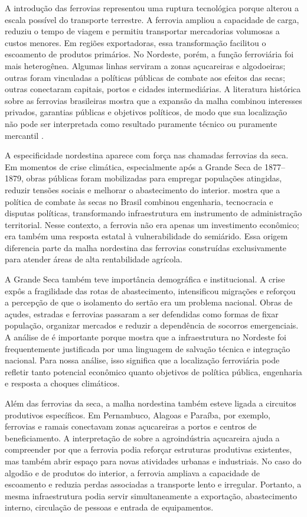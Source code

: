 \documentclass[12pt,a4paper]{article}
\begin{document}
A introdução das ferrovias representou uma ruptura tecnológica porque alterou a escala possível do transporte terrestre. A ferrovia ampliou a capacidade de carga, reduziu o tempo de viagem e permitiu transportar mercadorias volumosas a custos menores. Em regiões exportadoras, essa transformação facilitou o escoamento de produtos primários. No Nordeste, porém, a função ferroviária foi mais heterogênea. Algumas linhas serviram a zonas açucareiras e algodoeiras; outras foram vinculadas a políticas públicas de combate aos efeitos das secas; outras conectaram capitais, portos e cidades intermediárias. A literatura histórica sobre as ferrovias brasileiras mostra que a expansão da malha combinou interesses privados, garantias públicas e objetivos políticos, de modo que sua localização não pode ser interpretada como resultado puramente técnico ou puramente mercantil \citep{crockatt1893,summerhill2003}.

A especificidade nordestina aparece com força nas chamadas ferrovias da seca. Em momentos de crise climática, especialmente após a Grande Seca de 1877--1879, obras públicas foram mobilizadas para empregar populações atingidas, reduzir tensões sociais e melhorar o abastecimento do interior. \citet{buckley2000} mostra que a política de combate às secas no Brasil combinou engenharia, tecnocracia e disputas políticas, transformando infraestrutura em instrumento de administração territorial. Nesse contexto, a ferrovia não era apenas um investimento econômico; era também uma resposta estatal à vulnerabilidade do semiárido. Essa origem diferencia parte da malha nordestina das ferrovias construídas exclusivamente para atender áreas de alta rentabilidade agrícola.

A Grande Seca também teve importância demográfica e institucional. A crise expôs a fragilidade das rotas de abastecimento, intensificou migrações e reforçou a percepção de que o isolamento do sertão era um problema nacional. Obras de açudes, estradas e ferrovias passaram a ser defendidas como formas de fixar população, organizar mercados e reduzir a dependência de socorros emergenciais. A análise de \citet{buckley2000} é importante porque mostra que a infraestrutura no Nordeste foi frequentemente justificada por uma linguagem de salvação técnica e integração nacional. Para nossa análise, isso significa que a localização ferroviária pode refletir tanto potencial econômico quanto objetivos de política pública, engenharia e resposta a choques climáticos.

Além das ferrovias da seca, a malha nordestina também esteve ligada a circuitos produtivos específicos. Em Pernambuco, Alagoas e Paraíba, por exemplo, ferrovias e ramais conectavam zonas açucareiras a portos e centros de beneficiamento. A interpretação de \citet{eisenberg1974} sobre a agroindústria açucareira ajuda a compreender por que a ferrovia podia reforçar estruturas produtivas existentes, mas também abrir espaço para novas atividades urbanas e industriais. No caso do algodão e de produtos do interior, a ferrovia ampliava a capacidade de escoamento e reduzia perdas associadas a transporte lento e irregular. Portanto, a mesma infraestrutura podia servir simultaneamente a exportação, abastecimento interno, circulação de pessoas e entrada de equipamentos.
\end{document}
